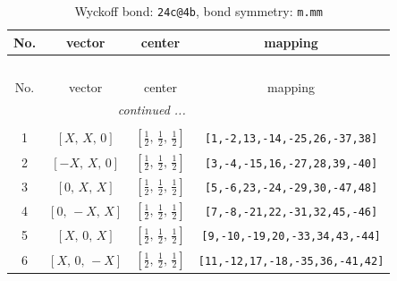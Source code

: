 \documentclass[fleqn,8pt]{jsarticle}
\begin{document}
\begin{longtable}{cccc}
\caption{Wyckoff bond: {\tt 24c@4b}, bond symmetry: {\tt m.mm}}
 \\
 \hline \hline
No. & vector & center & mapping \\ \hline \endfirsthead

\multicolumn{3}{l}{\tablename\ \thetable{}} \\
 \hline \hline
No. & vector & center & mapping \\ \hline \endhead

 \hline \hline
\multicolumn{3}{r}{\footnotesize\it continued ...} \\ \endfoot

 \hline \hline
\multicolumn{3}{r}{} \\ \endlastfoot

1 & $\left[ X,\, X,\, 0 \right]$ & $\left[ \frac{1}{2},\, \frac{1}{2},\, \frac{1}{2} \right]$ & {\tt [1,-2,13,-14,-25,26,-37,38]} \\ \hline
2 & $\left[ - X,\, X,\, 0 \right]$ & $\left[ \frac{1}{2},\, \frac{1}{2},\, \frac{1}{2} \right]$ & {\tt [3,-4,-15,16,-27,28,39,-40]} \\ \hline
3 & $\left[ 0,\, X,\, X \right]$ & $\left[ \frac{1}{2},\, \frac{1}{2},\, \frac{1}{2} \right]$ & {\tt [5,-6,23,-24,-29,30,-47,48]} \\ \hline
4 & $\left[ 0,\, - X,\, X \right]$ & $\left[ \frac{1}{2},\, \frac{1}{2},\, \frac{1}{2} \right]$ & {\tt [7,-8,-21,22,-31,32,45,-46]} \\ \hline
5 & $\left[ X,\, 0,\, X \right]$ & $\left[ \frac{1}{2},\, \frac{1}{2},\, \frac{1}{2} \right]$ & {\tt [9,-10,-19,20,-33,34,43,-44]} \\ \hline
6 & $\left[ X,\, 0,\, - X \right]$ & $\left[ \frac{1}{2},\, \frac{1}{2},\, \frac{1}{2} \right]$ & {\tt [11,-12,17,-18,-35,36,-41,42]} \\
\end{longtable}
\renewcommand{\arraystretch}{1.2}
\end{document}
